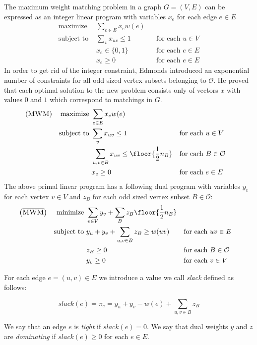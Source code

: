 The maximum weight matching problem in a graph $G=(V,E)$ can be expressed as an integer linear program with variables $x_e$ for each edge $e \in E$
\begin{align*}
\text{maximize }   & \sum_{e \in E} x_e w(e) \\
\text{subject to } & \sum_v x_{uv} \leq 1 &&\text{for each $u \in V$} \\
                   & x_e \in\{0, 1\}      &&\text{for each $e \in E$} \\
                   & x_e \geq 0           &&\text{for each $e \in E$}    
\end{align*}
In order to get rid of the integer constraint, Edmonds introduced an exponential number of constraints for all odd sized vertex subsets belonging to $\mathcal{O}$. He proved that each optimal solution to the new problem consists only of vectors $x$ with values $0$ and $1$ which correspond to matchings in $G$.
\begin{align*}
\left(\textsc{MWM}\right) && \text{maximize }   & \sum_{e \in E} x_e w(e)\\
&& \text{subject to } & \sum_v x_{uv} \leq 1 &&\text{for each $u \in V$} \\
                   &&& \sum_{u, v \in B} x_{uv} \leq \floor{\frac{1}{2}n_B} &&\text{for each $B \in \mathcal{O}$} \\
                   &&& x_e \geq 0           &&\text{for each $e \in E$}
\end{align*}
The above primal linear program has a following dual program with variables $y_v$ for each vertex $v \in V$ and $z_B$ for each odd sized vertex subset $B \in \mathcal{O}$:
\begin{align*}
\left(\overline{\textsc{MWM}}\right) && \text{minimize }   & \sum_{v\in V}y_v + \sum_{B} z_B \floor{\frac{1}{2}n_B} \\
&& \text{subject to } & y_u + y_v + \sum_{u, v \in B} z_B \geq w(uv) &&\text{for each $uv \in E$} \\
                   &&& z_B \geq 0          &&\text{for each $B \in \mathcal{O}$} \\
                   &&& y_v \geq 0          &&\text{for each $v \in V$}
\end{align*}

For each edge $e = (u, v) \in E$ we introduce a value we call \textit{slack} defined as follows:

\[slack(e) = \pi_e = y_u + y_v - w(e) + \sum_{u, v \in B} z_B\]

We say that an edge $e$ is \textit{tight} if $slack(e) = 0$. We say that dual weights $y$ and $z$ are \textit{dominating} if $slack(e) \geq 0$ for each $e \in E$.

